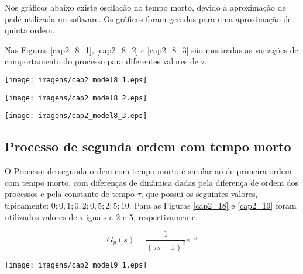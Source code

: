     Nos gráficos abaixo existe oscilação no tempo morto, devido à aproximação de
    padé utilizada no software. Os gráficos foram gerados para uma aproximação
    de quinta ordem.

    Nas Figuras \ref{cap2_8_1}, \ref{cap2_8_2} e \ref{cap2_8_3} são mostradas as
    variações de comportamento do processo para diferentes valores de $\tau$.

    \begin{center}
        \texttt{[image: imagens/cap2\_model8\_1.eps]}
	\label{cap2_8_1}
    \end{center}

    \begin{center}
        \texttt{[image: imagens/cap2\_model8\_2.eps]}
	\label{cap2_8_2}
    \end{center}
    
    \begin{center}
        \texttt{[image: imagens/cap2\_model8\_3.eps]}
	\label{cap2_8_3}
    \end{center}

\subsection{Processo de segunda ordem com tempo morto}
    
    O Processo de segunda ordem com tempo morto é similar ao de primeira ordem
    com tempo morto, com diferenças de dinâmica dadas pela diferença de ordem
    dos processos e pela constante de tempo $\tau$, que possui os seguintes valores,
    tipicamente: $0; 0,1; 0,2; 0,5; 2; 5; 10$. Para as Figuras
    \ref{cap2_18} e \ref{cap2_19} foram utilizados valores de $\tau$ iguais
    a 2 e 5, respectivamente.
    
    \begin{equation}
        G_p(s) = \frac{1}{(\tau s +1)^2}e^{-s}
    \end{equation}

    \begin{center}
        \texttt{[image: imagens/cap2\_model9\_1.eps]}
        \label{cap2_18}
    \end{center}
    
